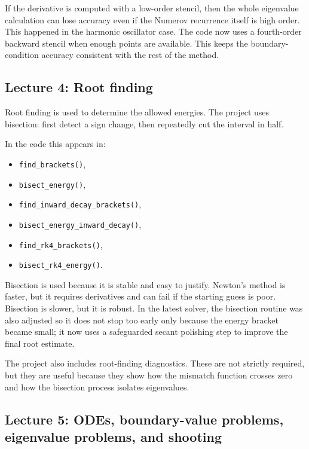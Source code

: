 \documentclass[11pt]{article}
\begin{document}
    If the derivative is computed with a low-order stencil, then the whole eigenvalue calculation can lose accuracy even if the Numerov recurrence itself is high order. This happened in the harmonic oscillator case. The code now uses a fourth-order backward stencil when enough points are available. This keeps the boundary-condition accuracy consistent with the rest of the method.

    \subsection{Lecture 4: Root finding}

    Root finding is used to determine the allowed energies. The project uses bisection: first detect a sign change, then repeatedly cut the interval in half.

    In the code this appears in:
    \begin{itemize}
        \item \texttt{find\_brackets()},
        \item \texttt{bisect\_energy()},
        \item \texttt{find\_inward\_decay\_brackets()},
        \item \texttt{bisect\_energy\_inward\_decay()},
        \item \texttt{find\_rk4\_brackets()},
        \item \texttt{bisect\_rk4\_energy()}.
    \end{itemize}

    Bisection is used because it is stable and easy to justify. Newton's method is faster, but it requires derivatives and can fail if the starting guess is poor. Bisection is slower, but it is robust. In the latest solver, the bisection routine was also adjusted so it does not stop too early only because the energy bracket became small; it now uses a safeguarded secant polishing step to improve the final root estimate.

    The project also includes root-finding diagnostics. These are not strictly required, but they are useful because they show how the mismatch function crosses zero and how the bisection process isolates eigenvalues.

    \subsection{Lecture 5: ODEs, boundary-value problems, eigenvalue problems, and shooting}
\end{document}
